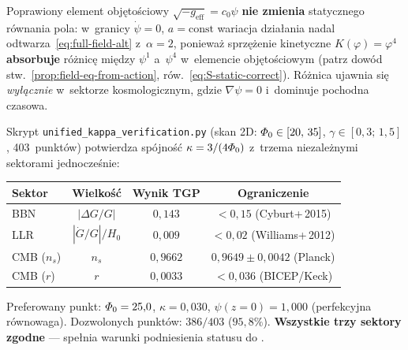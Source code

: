 \begin{remark}%
\label{rem:static-consistency}
Poprawiony element obj\k{e}to\'sciowy $\sqrt{-g_{\mathrm{eff}}} = c_0\psi$
\textbf{nie zmienia} statycznego r\'ownania pola: w~granicy
$\dot\psi = 0$, $a = \mathrm{const}$ wariacja dzia\l{}ania
nadal odtwarza~\eqref{eq:full-field-alt} z~$\alpha = 2$,
poniewa\.z sprz\k{e}\.zenie kinetyczne $K(\varphi) = \varphi^4$
\textbf{absorbuje} r\'o\.znic\k{e} mi\k{e}dzy $\psi^1$ a~$\psi^4$
w~elemencie obj\k{e}to\'sciowym
(patrz dow\'od stw.~\ref{prop:field-eq-from-action},
r\'ow.~\eqref{eq:S-static-correct}).
R\'o\.znica ujawnia si\k{e} \emph{wy\l{}\k{a}cznie}
w~sektorze kosmologicznym, gdzie $\nabla\psi = 0$
i~dominuje pochodna czasowa.
\end{remark}

\begin{remark}[Weryfikacja numeryczna $\kappa = 3/(4\PhiZero)$]%
\label{rem:kappa-verification}
Skrypt \texttt{unified\_kappa\_verification.py} (skan 2D:
$\varPhi_0 \in [20,\,35]$, $\gamma \in [0{,}3;\,1{,}5]$,
403~punkt\'ow) potwierdza sp\'ojno\'s\'c $\kappa = 3/(4\PhiZero)$
z~trzema niezale\.znymi sektorami jednocze\'snie:

\begin{center}\small
\begin{tabular}{@{}lccc@{}}
\toprule
\textbf{Sektor} & \textbf{Wielko\'s\'c} & \textbf{Wynik TGP}
  & \textbf{Ograniczenie} \\
\midrule
BBN & $|\Delta G/G|$ & $0{,}143$ & $< 0{,}15$ (Cyburt+\,2015) \\
LLR & $|\dot G/G|/H_0$ & $0{,}009$ & $< 0{,}02$ (Williams+\,2012) \\
CMB ($n_s$) & $n_s$ & $0{,}9662$ & $0{,}9649 \pm 0{,}0042$ (Planck) \\
CMB ($r$) & $r$ & $0{,}0033$ & $< 0{,}036$ (BICEP/Keck) \\
\bottomrule
\end{tabular}
\end{center}

\noindent
Preferowany punkt: $\varPhi_0 = 25{,}0$, $\kappa = 0{,}030$,
$\psi(z{=}0) = 1{,}000$ (perfekcyjna r\'ownowaga).
Dozwolonych punkt\'ow: $386/403$ ($95{,}8\%$).
\textbf{Wszystkie trzy sektory zgodne} --- spe\l{}nia warunki
podniesienia statusu do .
\end{remark}

